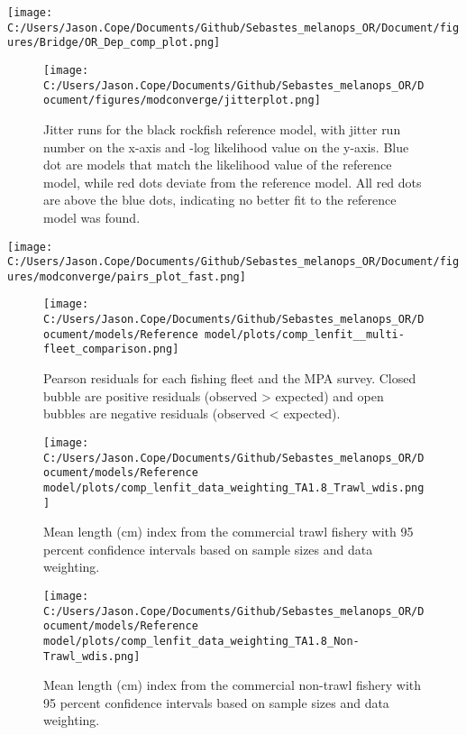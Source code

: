 \documentclass[11pt,
  english,
  letterpaper,
]{article}
\begin{document}
\texttt{[image: C:/Users/Jason.Cope/Documents/Github/Sebastes\_melanops\_OR/Document/figures/Bridge/OR\_Dep\_comp\_plot.png]} \clearpage

\begin{figure}
\centering
\texttt{[image: C:/Users/Jason.Cope/Documents/Github/Sebastes\_melanops\_OR/Document/figures/modconverge/jitterplot.png]}
\caption{Jitter runs for the black rockfish reference model, with jitter run number on the x-axis and -log likelihood value on the y-axis. Blue dot are models that match the likelihood value of the reference model, while red dots deviate from the reference model. All red dots are above the blue dots, indicating no better fit to the reference model was found.\label{fig:jitter}}
\end{figure}

\texttt{[image: C:/Users/Jason.Cope/Documents/Github/Sebastes\_melanops\_OR/Document/figures/modconverge/pairs\_plot\_fast.png]} \clearpage

\begin{figure}
\centering
\texttt{[image: C:/Users/Jason.Cope/Documents/Github/Sebastes\_melanops\_OR/Document/models/Reference model/plots/comp\_lenfit\_\_multi-fleet\_comparison.png]}
\caption{Pearson residuals for each fishing fleet and the MPA survey. Closed bubble are positive residuals (observed \textgreater{} expected) and open bubbles are negative residuals (observed \textless{} expected).\label{fig:lt-pearson-resids}}
\end{figure}

\begin{figure}
\centering
\texttt{[image: C:/Users/Jason.Cope/Documents/Github/Sebastes\_melanops\_OR/Document/models/Reference model/plots/comp\_lenfit\_data\_weighting\_TA1.8\_Trawl\_wdis.png]}
\caption{Mean length (cm) index from the commercial trawl fishery with 95 percent confidence intervals based on sample sizes and data weighting.\label{fig:trawl-mean-len-fit}}
\end{figure}

\begin{figure}
\centering
\texttt{[image: C:/Users/Jason.Cope/Documents/Github/Sebastes\_melanops\_OR/Document/models/Reference model/plots/comp\_lenfit\_data\_weighting\_TA1.8\_Non-Trawl\_wdis.png]}
\caption{Mean length (cm) index from the commercial non-trawl fishery with 95 percent confidence intervals based on sample sizes and data weighting.\label{fig:nontrawl-mean-len-fit}}
\end{figure}
\end{document}
